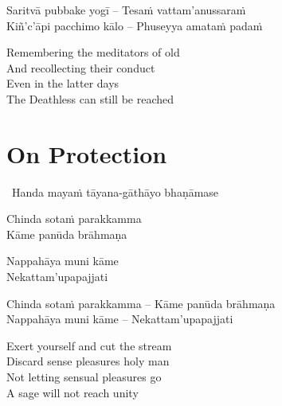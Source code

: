 \else

\begin{verses}
  Saritvā pubbake yogī – Tesaṁ vattam'anussaraṁ\\
  Kiñ'c'āpi pacchimo kālo – Phuseyya amataṁ padaṁ
\end{verses}

\fi

\begin{english-verses}
  Remembering the meditators of old\\
  And recollecting their conduct\\
  Even in the latter days\\
  The Deathless can still be reached
\end{english-verses}

\suttaRef{[Thag 16.10]}

\ifdigital{}\fi



\section{On Protection}
\label{protection}

\begin{leader}
  \anglebracketleft\ \hspace{-0.5mm}Handa mayaṁ tāyana-gāthāyo bhaṇāmase \hspace{-0.5mm}\anglebracketright\
\end{leader}

\ifninebythirteen

\begin{pali-hang-verses}
  Chinda sotaṁ parakkamma\\
  Kāme panūda brāhmaṇa
\end{pali-hang-verses}
\begin{pali-hang-together}
  Nappahāya muni kāme\\
  Nekattam'upapajjati
\end{pali-hang-together}

\else

\begin{verses}
  Chinda sotaṁ parakkamma – Kāme panūda brāhmaṇa\\
  Nappahāya muni kāme – Nekattam'upapajjati
\end{verses}

\fi

\begin{english-verses}
  Exert yourself and cut the stream\\
  Discard sense pleasures holy man\\
  Not letting sensual pleasures go\\
  A sage will not reach unity\makeatletter\hyperlink{endnote40-appendix}\makeatother
\end{english-verses}

